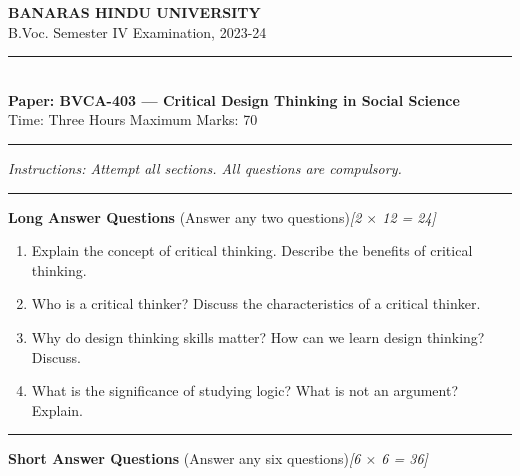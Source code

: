 \documentclass[11pt,a4paper]{article}
\newcommand{\pts}[1]{\hfill   \textit{[#1]}}
\begin{document}
\begin{center}
  {\large\bfseries BANARAS HINDU UNIVERSITY}\\[2pt]
  {
\normalsize B.Voc. Semester IV Examination, 2023-24}\\[6pt]
  \rule{0.8\linewidth}{0.5pt}\\[6pt]
  {\large\bfseries Paper: BVCA-403 --- Critical Design Thinking in Social Science}\\[4pt]
  {
\normalsize Time: Three Hours \hfill Maximum Marks: 70}
\end{center}

\rule{\linewidth}{0.4pt}

\smallskip



\noindent   \textit{Instructions: Attempt all sections. All questions are compulsory.}

\bigskip

\bigskip



\rule{\linewidth}{0.4pt}\smallskip




\noindent   \textbf{Long Answer Questions} (Answer any two questions)\pts{2 $ \times$ 12 = 24}

\begin{enumerate}[label=\arabic*.,leftmargin=*,itemsep=8pt]
  \item Explain the concept of critical thinking. Describe the benefits of critical thinking.
  \item Who is a critical thinker? Discuss the characteristics of a critical thinker.
  \item Why do design thinking skills matter? How can we learn design thinking? Discuss.
  \item What is the significance of studying logic? What is not an argument? Explain.
\end{enumerate}

\bigskip



\rule{\linewidth}{0.4pt}\smallskip




\noindent   \textbf{Short Answer Questions} (Answer any six questions)\pts{6 $ \times$ 6 = 36}
\end{document}
